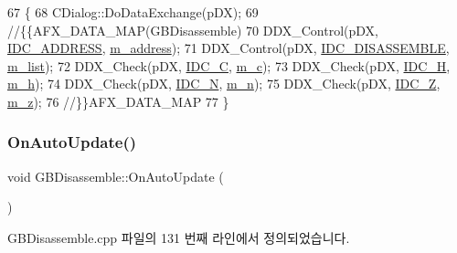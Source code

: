 \begin{DoxyCode}
67 \{
68   CDialog::DoDataExchange(pDX);
69   \textcolor{comment}{//\{\{AFX\_DATA\_MAP(GBDisassemble)}
70   DDX\_Control(pDX, \mbox{\hyperlink{resource_8h_af0726d27cf7b7070867a81fde283a218}{IDC\_ADDRESS}}, \mbox{\hyperlink{class_g_b_disassemble_ae307e3f799572b623e21bb94c345c5ce}{m\_address}});
71   DDX\_Control(pDX, \mbox{\hyperlink{resource_8h_a1e77bc2c6285101b4f86fb554e60299c}{IDC\_DISASSEMBLE}}, \mbox{\hyperlink{class_g_b_disassemble_a9c85552a373d70a612231c68d2702658}{m\_list}});
72   DDX\_Check(pDX, \mbox{\hyperlink{resource_8h_a03060b66d7605871c04bec4173831ab7}{IDC\_C}}, \mbox{\hyperlink{class_g_b_disassemble_aa5e67e4603c41c05ed19f599336139be}{m\_c}});
73   DDX\_Check(pDX, \mbox{\hyperlink{resource_8h_aa29d7e7fac80dd8fe1755b2d12cc8249}{IDC\_H}}, \mbox{\hyperlink{class_g_b_disassemble_a2756a29fdbf8424bd977ea326b00b9e7}{m\_h}});
74   DDX\_Check(pDX, \mbox{\hyperlink{resource_8h_a38206af99e79e574c7d61741824783aa}{IDC\_N}}, \mbox{\hyperlink{class_g_b_disassemble_acd44f179ab1fc59a252e21370ce183e9}{m\_n}});
75   DDX\_Check(pDX, \mbox{\hyperlink{resource_8h_a1c7d666c64cc5fe574706f800edacc1e}{IDC\_Z}}, \mbox{\hyperlink{class_g_b_disassemble_a3fe7947162446aea8ba1dcb1e6920b60}{m\_z}});
76   \textcolor{comment}{//\}\}AFX\_DATA\_MAP}
77 \}
\end{DoxyCode}
\mbox{\label{class_g_b_disassemble_a5fad3e2f0c06721bd881fa0dda1001e4}} 
\subsubsection{\texorpdfstring{On\+Auto\+Update()}{OnAutoUpdate()}}
{\footnotesize\ttfamily void G\+B\+Disassemble\+::\+On\+Auto\+Update (\begin{DoxyParamCaption}{ }\end{DoxyParamCaption})\hspace{0.3cm}{\ttfamily [protected]}}



G\+B\+Disassemble.\+cpp 파일의 131 번째 라인에서 정의되었습니다.


